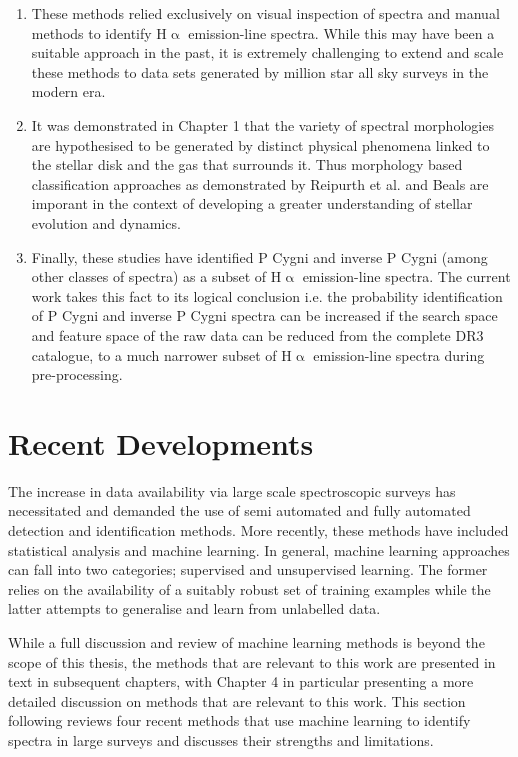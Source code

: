 \begin{enumerate}
\item These methods relied exclusively on visual inspection of spectra and manual methods to identify H$\upalpha$ emission-line spectra. While this may have been a suitable approach in the past, it is extremely challenging to extend and scale these methods to data sets generated by million star all sky surveys in the modern era.

\item It was demonstrated in Chapter 1 that the variety of spectral morphologies are hypothesised to be generated by distinct physical phenomena linked to the stellar disk and the gas that surrounds it. Thus morphology based classification approaches as demonstrated by Reipurth et al. and Beals are imporant in the context of developing a greater understanding of stellar evolution and dynamics.

\item Finally, these studies have identified P Cygni and inverse P Cygni (among other classes of spectra) as a subset of H$\upalpha$ emission-line spectra. The current work takes this fact to its logical conclusion i.e. the probability identification of P Cygni and inverse P Cygni spectra can be increased if the search space and feature space of the raw data can be reduced from the complete DR3 catalogue, to a much narrower subset of H$\upalpha$ emission-line spectra during pre-processing. 
\end{enumerate}

\section{Recent Developments}

The increase in data availability via large scale spectroscopic surveys has necessitated and demanded the use of semi automated and fully automated detection and identification methods. More recently, these methods have included statistical analysis and machine learning. In general, machine learning approaches can fall into two categories; supervised and unsupervised learning. The former relies on the availability of a suitably robust set of training examples while the latter attempts to generalise and learn from unlabelled data\cite{hastie2009elements}. 

While a full discussion and review of machine learning methods is beyond the scope of this thesis, the methods that are relevant to this work are presented in text in subsequent chapters, with Chapter 4 in particular presenting a more detailed discussion on methods that are relevant to this work. This section following reviews four recent methods that use machine learning to identify spectra in large surveys and discusses their strengths and limitations.

